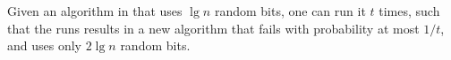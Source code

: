 \begin{lemma}
        Given an algorithm \Alg in  that uses $\lg n$
        random bits, one can run it $t$ times, such that the runs
        results in a new algorithm that fails with probability at most
        $1/t$, and uses only $2\lg n$ random bits.
    \end{lemma}
